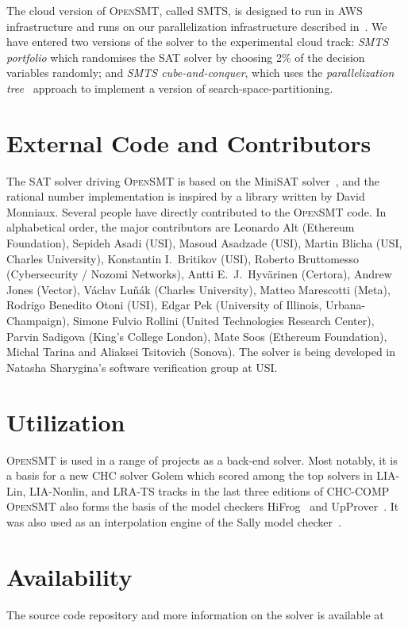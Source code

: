 \documentclass{easychair}
\newcommand{\opensmt}{\textsc{OpenSMT}\xspace}
\begin{document}
The cloud version of \opensmt, called SMTS, is designed to run in AWS
infrastructure and runs on our parallelization infrastructure described
in~\cite{MarescottiHS18}.
%
We have entered two versions of the solver to the experimental cloud
track: {\em SMTS portfolio} which randomises the SAT solver by choosing
2\% of the decision variables randomly; and {\em SMTS cube-and-conquer},
which uses the {\em parallelization tree}~\cite{HyvarinenMS:SAT15}
approach to implement a version of search-space-partitioning.
\fi

\section{External Code and Contributors}

The SAT solver driving \opensmt is based on the MiniSAT
solver~\cite{EenS:SAT03}, and the rational number implementation is
inspired by a library written by David Monniaux.  Several people have
directly contributed to the \opensmt code.  In alphabetical order, the
major contributors are
%
Leonardo Alt (Ethereum Foundation),
Sepideh Asadi (USI),
Masoud Asadzade (USI),
Martin Blicha (USI, Charles University),
Konstantin I.~Britikov (USI),
Roberto Bruttomesso (Cybersecurity / Nozomi Networks),
Antti E.~J.~Hyv{\"a}rinen (Certora),
Andrew Jones (Vector),
V{\'a}clav Lu{\v n}{\'a}k (Charles University),
Matteo Marescotti (Meta),
Rodrigo Benedito Otoni (USI),
Edgar Pek (University of Illinois, Urbana-Champaign),
Simone Fulvio Rollini (United Technologies Research Center),
Parvin Sadigova (King's College London),
Mate Soos (Ethereum Foundation),
Michal Tarina
and Aliaksei Tsitovich (Sonova).
%
The solver is being developed in Natasha Sharygina's software
verification group at USI.

\section{Utilization}

\opensmt is used in a range of projects as a back-end solver.
Most notably, it is a basis for a new CHC solver Golem which scored among the top solvers
in LIA-Lin, LIA-Nonlin, and LRA-TS tracks in the last three editions of CHC-COMP~\cite{}
\opensmt also forms the basis of the model checkers HiFrog~\cite{AltACMFHS17} and
UpProver~\cite{Asadi_2020b}.
It was also used as an interpolation engine of the Sally model
checker~\cite{JovanovicD:FMCAD16}.

\section{Availability}
The source code repository and more information on the solver is
available at
\end{document}
